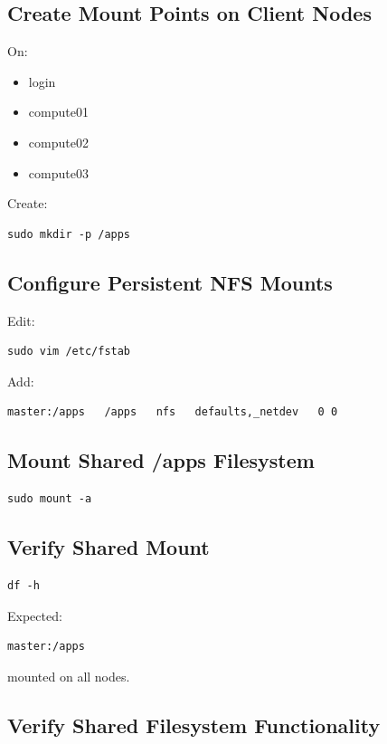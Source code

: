 \documentclass[11pt]{article}
\begin{document}
\subsection{Create Mount Points on Client Nodes}
\label{sec:org8c5db25}

On:
\begin{itemize}
\item login
\item compute01
\item compute02
\item compute03
\end{itemize}

Create:

\begin{verbatim}
sudo mkdir -p /apps
\end{verbatim}
\subsection{Configure Persistent NFS Mounts}
\label{sec:orgf10933e}

Edit:

\begin{verbatim}
sudo vim /etc/fstab
\end{verbatim}

Add:

\begin{verbatim}
master:/apps   /apps   nfs   defaults,_netdev   0 0
\end{verbatim}
\subsection{Mount Shared /apps Filesystem}
\label{sec:org0ea59ad}

\begin{verbatim}
sudo mount -a
\end{verbatim}
\subsection{Verify Shared Mount}
\label{sec:org1596133}

\begin{verbatim}
df -h
\end{verbatim}

Expected:

\begin{verbatim}
master:/apps
\end{verbatim}

mounted on all nodes.
\subsection{Verify Shared Filesystem Functionality}
\label{sec:org8c2c7d3}
\end{document}
